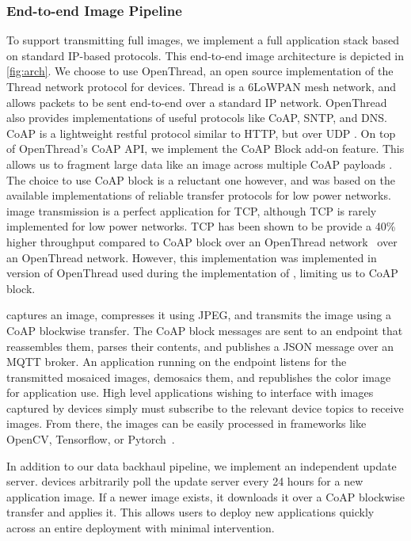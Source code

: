 \subsubsection{End-to-end Image Pipeline}
To support transmitting full images, we implement a full application stack based on standard IP-based protocols. This end-to-end image architecture is depicted in \cref{fig:arch}.
We choose to use OpenThread, an open source implementation of the Thread network protocol for \namec devices. Thread is a 6LoWPAN mesh network, and allows packets to be sent end-to-end over a standard IP network. OpenThread also provides implementations of useful protocols like CoAP, SNTP, and DNS. 
CoAP is a lightweight restful protocol similar to HTTP, but over UDP \cite{shelby2014constrained}. 
On top of OpenThread's CoAP API, we implement the CoAP Block add-on feature. This allows us to fragment large data like an image across multiple CoAP payloads \cite{bormann2016block}. 
The choice to use CoAP block is a reluctant one however, and was based on the available implementations of reliable transfer protocols for low power networks.
\namec image transmission is a perfect application for TCP, although TCP is rarely implemented for low power networks. TCP has been shown to be provide a 40\% higher throughput compared to CoAP block over an OpenThread network~\cite{kumar2020performant} over an OpenThread network. However, this implementation was implemented in version of OpenThread used during the implementation of \namec, limiting us to CoAP block.

\namec captures an image, compresses it using JPEG, and transmits the image using a CoAP blockwise transfer. The CoAP block messages are sent to an endpoint that reassembles them, parses their contents, and publishes a JSON message over an MQTT broker. An application running on the endpoint listens for the transmitted mosaiced images, demosaics them, and republishes the color image for application use. High level applications wishing to interface with images captured by \namec devices simply must subscribe to the relevant device topics to receive images. From there, the images can be easily processed in frameworks like OpenCV, Tensorflow, or Pytorch~\cite{tensorflow2015-whitepaper, pytorch,itseez2015opencv}.

In addition to our data backhaul pipeline, we implement an independent update server. \namec devices arbitrarily poll the update server every 24 hours for a new application image. If a newer image exists, it downloads it over a CoAP blockwise transfer and applies it. This allows users to deploy new applications quickly across an entire deployment with minimal intervention.


